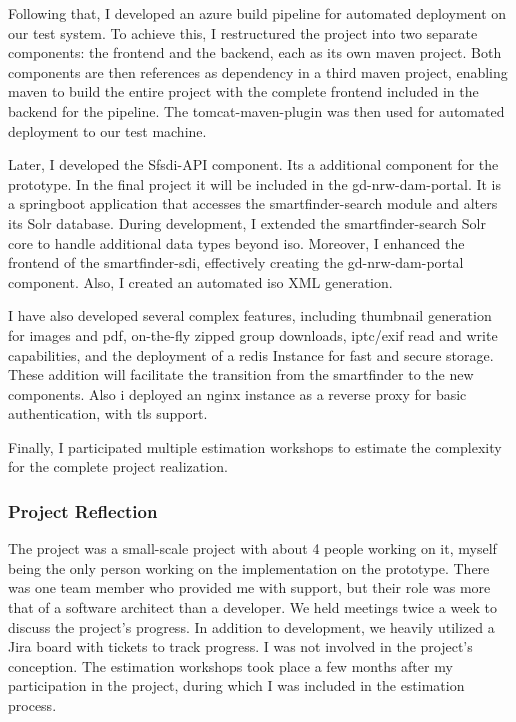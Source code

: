 \documentclass[11pt, titlepage, a4paper]{article}
\begin{document}
Following that, I developed an \Gls{azure} build pipeline for automated deployment on our test system.  To achieve this, I restructured the project into two separate components: the frontend and the backend, each as its own \Gls{maven} project. %
Both components are then references as dependency in a third \Gls{maven} project, enabling \Gls{maven} to build the entire project with the complete frontend included in the backend for the pipeline. The tomcat-maven-plugin was then used for automated deployment to our test machine.

Later, I developed the Sfsdi-API component. Its a additional component for the prototype. In the final project it will be included in the gd-nrw-dam-portal. It is a \Gls{springboot} application that accesses the smartfinder-search module and alters its Solr database. During development, I extended the smartfinder-search Solr core to handle additional data types beyond \gls{iso}. Moreover, I enhanced the frontend of the smartfinder-sdi, effectively creating the gd-nrw-dam-portal component.
Also, I created an automated \gls{iso} XML generation.

I have also developed several complex features, including thumbnail generation for images and \gls{pdf}, on-the-fly zipped group downloads, \gls{iptc}/\gls{exif} read and write capabilities, and the deployment of a \Gls{redis} Instance for fast and secure storage. These addition will facilitate the transition from the smartfinder to the new components. Also i deployed an \Gls{nginx} instance as a reverse proxy for basic authentication, with \gls{tls} support.

Finally, I participated multiple estimation workshops to estimate the complexity for the complete project realization.

\subsubsection{Project Reflection}
The project was a small-scale project with about 4 people working on it, myself being the only person working on the implementation on the prototype. There was one team member who provided me with support, but their role was more that of a software architect than a developer.
We held meetings twice a week to discuss the project's progress. In addition to development, we heavily utilized a Jira board with tickets to track progress. I was not involved in the project's conception.
The estimation workshops took place a few months after my participation in the project, during which I was included in the estimation process.
\end{document}
